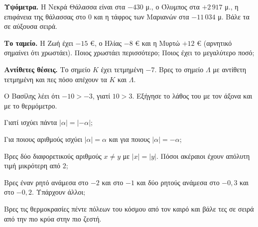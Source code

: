 \ex \textbf{Υψόμετρα.} Η Νεκρά Θάλασσα είναι στα $-430$ μ., ο Όλυμπος στα $+2\,917$ μ., η επιφάνεια της θάλασσας στο $0$ και η τάφρος των Μαριανών στα $-11\,034$ μ. Βάλε τα σε αύξουσα σειρά.

\ex \textbf{Το ταμείο.} Η Ζωή έχει $-15$ €, ο Ηλίας $-8$ € και η Μυρτώ $+12$ € (αρνητικό σημαίνει ότι χρωστάει). Ποιος χρωστάει περισσότερο; Ποιος έχει το μεγαλύτερο ποσό;

\ex \textbf{Αντίθετες θέσεις.} Το σημείο $K$ έχει τετμημένη $-7$. Βρες το σημείο $\Lambda$ με αντίθετη τετμημένη και πες πόσο απέχουν τα $K$ και $\Lambda$.


\ex Ο Βασίλης λέει ότι $-10>-3$, γιατί $10>3$. Εξήγησε το λάθος του με τον άξονα και με το θερμόμετρο.

\ex Γιατί ισχύει πάντα $|\alpha|=|-\alpha|$;

\ex Για ποιους αριθμούς ισχύει $|\alpha|=\alpha$ και για ποιους $|\alpha|=-\alpha$;

\ex Βρες δύο διαφορετικούς αριθμούς $x\neq y$ με $|x|=|y|$. Πόσοι ακέραιοι έχουν απόλυτη τιμή μικρότερη από $2$;

\ex Βρες έναν ρητό ανάμεσα στο $-2$ και στο $-1$ και δύο ρητούς ανάμεσα στο $-0{,}3$ και στο $-0{,}2$. Υπάρχουν άλλοι;


\ex Βρες τις θερμοκρασίες πέντε πόλεων του κόσμου από τον καιρό και βάλε τες σε σειρά από την πιο κρύα στην πιο ζεστή.

